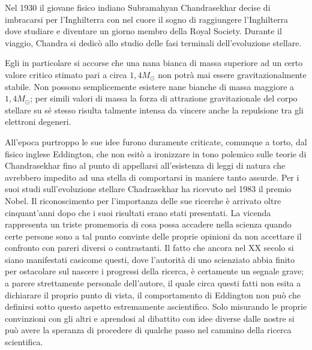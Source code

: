 
\label{chandra}
\minitoc\mtcskip
\noindent Nel 1930 il giovane fisico indiano Subramahyan Chandrasekhar decise di imbracarsi per l'Inghilterra con nel cuore il sogno di raggiungere l'Inghilterra dove studiare e diventare un giorno membro della Royal Society.
Durante il viaggio, Chandra si dedicò allo studio delle fasi terminali dell'evoluzione stellare.
\par
Egli in particolare si accorse che una nana bianca di massa superiore ad un certo valore critico stimato pari a circa $1,4 M_{\odot}$ non potr\`{a} mai essere gravitazionalmente stabile. Non possono semplicemente esistere nane bianche di massa maggiore a $1,4 M_{\odot}$; per simili valori di massa la forza di attrazione gravitazionale del corpo stellare su sé stesso risulta talmente intensa da vincere anche la repulsione tra gli elettroni degeneri.
\par
All'epoca purtroppo le sue idee furono duramente criticate, comunque a torto, dal fisico inglese Eddington, che non esitò a ironizzare in tono polemico sulle teorie di Chandrasekhar fino al punto di appellarsi all'esistenza di leggi di natura che avrebbero impedito ad una stella di comportarsi in maniere tanto assurde.
Per i suoi studi sull'evoluzione stellare Chadrasekhar ha ricevuto nel 1983 il premio Nobel. Il riconoscimento per l'importanza delle sue ricerche è arrivato oltre cinquant'anni dopo che i suoi risultati erano stati presentati. La vicenda rappresenta un triste promemoria di cosa possa accadere nella scienza quando certe persone sono a tal punto convinte delle proprie opinioni da non accettare il confronto con pareri diversi o contrastanti. Il fatto che ancora nel XX secolo si siano manifestati casicome questi, dove l'autorit\`{a} di uno scienziato abbia finito per ostacolare sul nascere i progressi della ricerca, è certamente un segnale grave; a parere strettamente personale dell'autore, il quale circa questi fatti non esita a dichiarare il proprio punto di vista, il comportamento di Eddington non può che definirsi sotto questo aspetto estremamente ascientifico. Solo misurando le proprie convinzioni con gli altri e aprendosi al dibattito con idee diverse dalle nostre si può avere la speranza di procedere di qualche passo nel cammino della ricerca scientifica.
